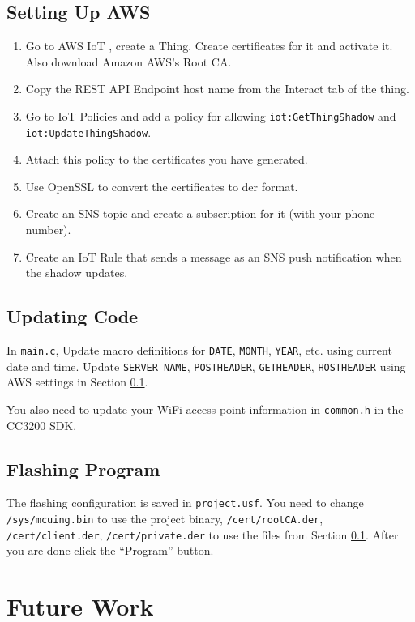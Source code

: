 \documentclass[conference]{IEEEtran}
\begin{document}
\subsection{Setting Up AWS}
\label{aws}
\begin{enumerate}
\item Go to AWS IoT \cite{aws}, create a Thing. Create certificates for it and
	activate it. Also download Amazon AWS's Root CA.
\item Copy the REST API Endpoint host name from the Interact tab of the thing.
\item Go to IoT Policies and add a policy for allowing
	\lstinline{iot:GetThingShadow} and \lstinline{iot:UpdateThingShadow}.
\item Attach this policy to the certificates you have generated.
\item Use OpenSSL to convert the certificates to der format.
\item Create an SNS topic and create a subscription for it (with your phone
	number).
\item Create an IoT Rule that sends a message as an SNS push notification when
	the shadow updates.
\end{enumerate}

\subsection{Updating Code}
In \lstinline{main.c}, Update macro definitions for \lstinline{DATE},
 \lstinline{MONTH}, \lstinline{YEAR}, etc. using current date and time.
 Update \lstinline{SERVER_NAME}, \lstinline{POSTHEADER}, \lstinline{GETHEADER},
 \lstinline{HOSTHEADER} using AWS settings in Section \ref{aws}.

You also need to update your WiFi access point information in
 \lstinline{common.h} in the CC3200 SDK.

\subsection{Flashing Program}
The flashing configuration is saved in \lstinline{project.usf}.
 You need to change \lstinline{/sys/mcuing.bin} to use the project binary,
 \lstinline{/cert/rootCA.der}, \lstinline{/cert/client.der},
 \lstinline{/cert/private.der} to use the files from Section \ref{aws}.
 After you are done click the ``Program'' button.

\section{Future Work}
\end{document}
